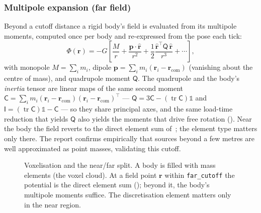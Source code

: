 \documentclass[11pt,a4paper]{article}
\theoremstyle{reqstyle}
\newcommand{\rv}{\mathbf{r}}
\newcommand{\rhat}{\hat{\mathbf{r}}}
\DeclareMathOperator{\tr}{tr}
\begin{document}
\subsubsection{Multipole expansion (far field)}
Beyond a cutoff distance a rigid body's field is evaluated from its multipole moments,
computed once per body and re-expressed from the pose each tick:
\begin{equation}
\Phi(\rv) = -G\!\left[\frac{M}{r}
+ \frac{\mathbf p\cdot\rhat}{r^2}
+ \frac{1}{2}\frac{\rhat^{\!\top} \mathsf{Q}\,\rhat}{r^3}
+ \cdots\right],
\end{equation}
with monopole $M=\sum_i m_i$, dipole $\mathbf p = \sum_i m_i(\rv_i-\rv_{\mathrm{com}})$
(vanishing about the centre of mass), and quadrupole moment $\mathsf{Q}$. The quadrupole and the
body's \emph{inertia} tensor are linear maps of the same second moment
$\mathsf{C}=\sum_i m_i(\rv_i-\rv_{\mathrm{com}})(\rv_i-\rv_{\mathrm{com}})^{\!\top}$ ---
$\mathsf{Q}=3\mathsf{C}-(\tr\mathsf{C})\mathbb 1$ and $\mathsf{I}=(\tr\mathsf{C})\mathbb 1-\mathsf{C}$
--- so they share principal axes, and the same load-time reduction that yields $\mathsf{Q}$ also
yields the moments that drive free rotation (). Near the body the
field reverts to the direct element sum of~; the element type matters only
there. The report confirms empirically that sources beyond a few metres are well
approximated as point masses, validating this cutoff.

\begin{figure}[h]
\centering
{}
\caption{Voxelisation and the near/far split. A body is filled with mass elements (the voxel
cloud). At a field point $\rv$ within \texttt{far\_cutoff} the potential is the direct element
sum (); beyond it, the body's multipole moments suffice. The discretisation
element matters only in the near region.}
\label{fig:voxel}
\end{figure}
\end{document}
